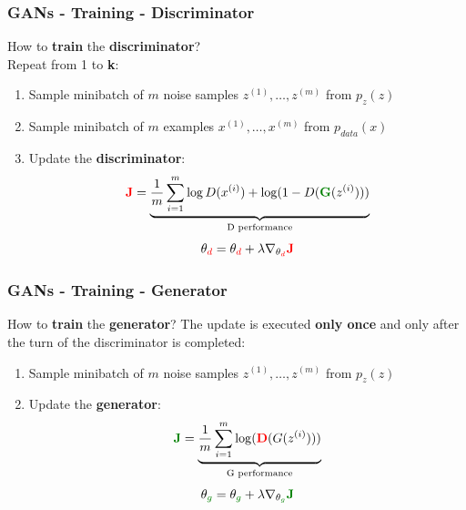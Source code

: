 \documentclass{beamer}
\begin{document}
\begin{frame}
	\frametitle{GANs - Training - Discriminator}
	How to \textbf{train} the \textbf{discriminator}? \\
	Repeat from 1 to \textbf{k}:
		\begin{enumerate}
			\item<1-> \alert<+>{Sample minibatch of $m$ noise samples ${z^{(1)},\dots,z^{(m)}}$ from $p_z(z)$}
			\item<2-> \alert<+>{Sample minibatch of $m$ examples ${x^{(1)},\dots,x^{(m)}}$ from $p_{data}(x)$}
			\item<3-> \alert<+>{Update the \textbf{discriminator}:
		\begin{equation*}
			\textcolor{red}{\mathbf{J}} =  \underbrace{\frac{1}{m} \sum_{i=1}^{m} \log D(x^{(i)}) + \log(1 - D(\textcolor{real}{\mathbf{G}}(z^{(i)})))}_{\text{D performance}}
		\end{equation*}
	\LARGE		
	\begin{equation*}
	\theta_{\textcolor{red}{d}} = \theta_{\textcolor{red}{d}} + \lambda \nabla_{\theta_{\textcolor{red}{d}}} \textcolor{red}{\mathbf{J}}
	\end{equation*}	
}
		\end{enumerate}
\end{frame}

\begin{frame}
	\frametitle{GANs - Training - Generator}
	How to \textbf{train} the \textbf{generator}? \newline
	The update is executed \textbf{only once} and only after the turn of the discriminator is completed:
	\begin{enumerate}
		\item<1-> \alert<+>{Sample minibatch of $m$ noise samples ${z^{(1)},\dots,z^{(m)}}$ from $p_z(z)$}
		\item<2-> \alert<+>{Update the \textbf{generator}:
			\begin{equation*}
			\textcolor{real}{\mathbf{J}} = \underbrace{\frac{1}{m} \sum_{i=1}^{m} \log( \textcolor{red}{\mathbf{D}}(G(z^{(i)})))}_{\text{G performance}}
			\end{equation*}
			\LARGE
			\begin{equation*}
			\theta_{\textcolor{real}{g}} = \theta_{\textcolor{real}{g}}  + \lambda \nabla_{\theta_{\textcolor{real}{g}}} \textcolor{real}{\mathbf{J}}
			\end{equation*}
}
	\end{enumerate}
\end{frame} 
\end{document}
